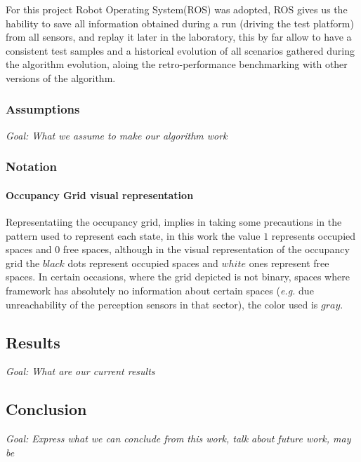 For this project Robot Operating System(ROS) was adopted, ROS gives us the hability to save all information obtained during a run (driving the test platform) from all sensors, and replay it later in the laboratory, this by far allow to have a consistent test samples and a historical evolution of all scenarios gathered during the algorithm evolution, aloing the retro-performance benchmarking with other versions of the algorithm.

\subsubsection*{Assumptions}

\textit{Goal: What we assume to make our algorithm work}

\subsubsection*{Notation}

\paragraph{Occupancy Grid visual representation}

Representatiing the occupancy grid, implies in taking some precautions in the pattern used to represent each state, in this work the value $1$ represents occupied spaces and $0$ free spaces, although in the visual representation of the occupancy grid the $black$ dots represent occupied spaces and $white$ ones represent free spaces. In certain occasions, where the grid depicted is not binary, spaces where framework has absolutely no information about certain spaces (\textit{e.g.} due unreachability of the perception sensors in that sector), the color used is $gray$.

\subsection{Results}

\textit{Goal: What are our current results}

\subsection{Conclusion}

\textit{Goal: Express what we can conclude from this work, talk about future work, may be}